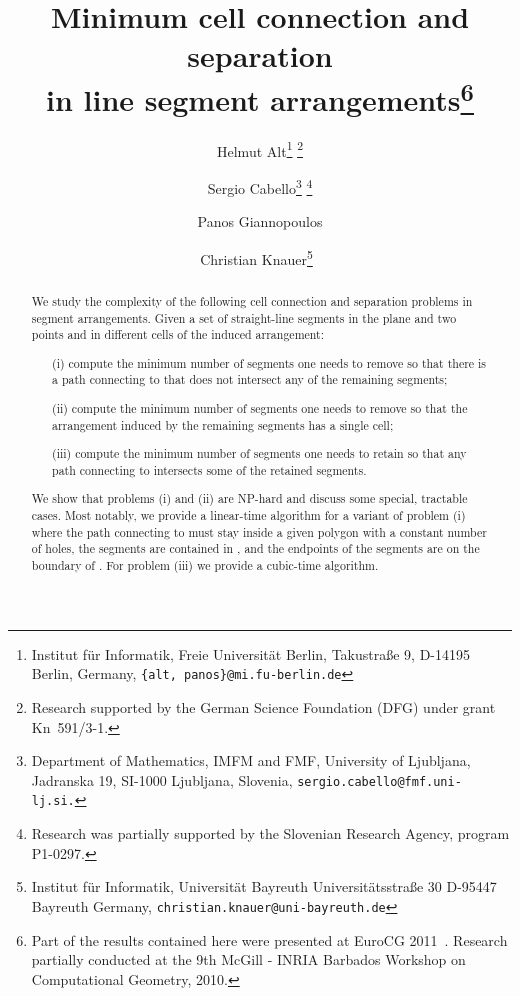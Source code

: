\documentclass[11pt,a4paper]{article}
\begin{document}
\pagestyle{plain}

\title{Minimum cell connection and separation\\ in line segment arrangements\thanks{Part of the results contained here were presented at EuroCG 2011~\cite{acgk-11}. Research partially conducted at the 9th McGill - INRIA Barbados Workshop on Computational Geometry, 2010.}}

\author{Helmut Alt\thanks{Institut f{\"ur} Informatik, Freie Universit{\"a}t Berlin,
    Takustra{\ss}e 9, D-14195 Berlin, Germany, {\tt \{alt, panos\}@mi.fu-berlin.de}}
    \footnote{Research supported by the German Science Foundation (DFG) under grant Kn~591/3-1.}
\and
Sergio Cabello\thanks{Department of Mathematics, IMFM and FMF, University of Ljubljana,
                Jadranska 19, SI-1000 Ljubljana, Slovenia, {\tt sergio.cabello@fmf.uni-lj.si.}}
       \footnote{Research was partially supported by the Slovenian Research Agency, program P1-0297.}
\and
Panos Giannopoulos\footnotemark[2]{\ }\footnotemark[3]
\and
Christian Knauer\thanks{Institut f{\"ur} Informatik, Universit{\"a}t Bayreuth
    Universit{\"a}tsstra{\ss}e 30
    D-95447 Bayreuth
    Germany, {\tt christian.knauer@uni-bayreuth.de}}{\ }\footnotemark[2]
}
\date{}
\maketitle

\begin{abstract}
We study the complexity of the following cell connection and separation problems in segment arrangements.
Given a set of straight-line segments in the plane and two points  and  in different cells of the induced arrangement:
\begin{itemize}
\setlength{\itemsep}{-\parsep}
\item[(i)] compute the minimum number of segments one needs to remove so that there is a path connecting  to  that does not intersect any of the remaining segments;
\item[(ii)] compute the minimum number of segments one needs to remove so that the arrangement induced by the remaining segments has a single cell;
\item[(iii)] compute the minimum number of segments one needs to retain so that any path connecting  to  intersects some of the retained segments.
\end{itemize}

We show that problems (i) and (ii) are NP-hard and discuss some special, tractable cases. Most notably, we provide a linear-time algorithm for a variant of problem (i) where the path connecting  to  must stay inside a given polygon  with a constant number of holes, the segments are contained in , and the endpoints of the segments are on the boundary of .
For problem (iii) we provide a cubic-time algorithm.
\end{abstract}
\end{document}
